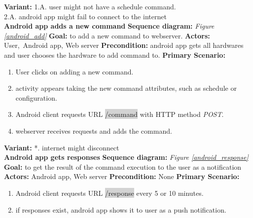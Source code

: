 \documentclass[12pt, oneside, a4paper]{book}
\newcommand{\code}[1]{{\color{red}\colorbox{lightgray}{#1}}}
\newcommand\boldcolor[1]{\textcolor{bold}{\textbf{#1}}}
\begin{document}
				\textbf{Variant:}\newline
				\hspace*{5mm}1.A. user might not have a schedule command. \\
				\hspace*{5mm}2.A. android app might fail to connect to the internet \\
				\newline\boldcolor{Android app adds a new command}
				\newline\textbf{Sequence diagram:} \textit{Figure \ref{android_add}}
				\newline\textbf{Goal:} to add a new command to webserver.
				\newline\textbf{Actors:} User, Android app, Web server
				\newline\textbf{Precondition:} android app gets all hardwares and user chooses the hardware to add command to.
				\newline\textbf{Primary Scenario:}	
				\begin{enumerate}[label*=\arabic*.]
					\item User clicks on adding  a new command.
					\item activity appears taking the new command attributes, such as schedule or configuration.
					\item Android client requests URL \code{/command} with HTTP method \textit{POST}.
					\item  webserver receives requests and adds the command.
				\end{enumerate}
				\textbf{Variant:}\newline
				\hspace*{5mm}*. internet might disconnect\\
				\newline\boldcolor{Android app gets responses}
				\newline\textbf{Sequence diagram:} \textit{Figure \ref{android_response}}
				\newline\textbf{Goal:} to get the result of the command execution to the user as a notification
				\newline\textbf{Actors:} Android app, Web server
				\newline\textbf{Precondition:} None
				\newline\textbf{Primary Scenario:}	
				\begin{enumerate}[label*=\arabic*.]
					\item Android client requests URL \code{/response} every 5 or 10 minutes.
					\item if responses exist, android app shows it to user as a push notification.
				\end{enumerate}
\end{document}
